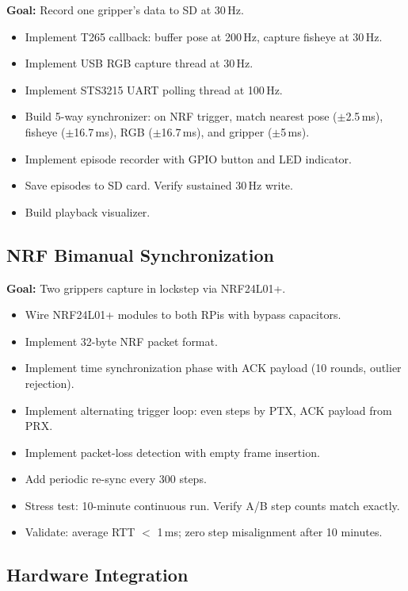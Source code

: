 \documentclass[11pt,a4paper]{article}
\begin{document}
\textbf{Goal:} Record one gripper's data to SD at 30\,Hz.

\begin{itemize}[label=$\square$]
  \item Implement T265 callback: buffer pose at 200\,Hz, capture fisheye at 30\,Hz.
  \item Implement USB RGB capture thread at 30\,Hz.
  \item Implement STS3215 UART polling thread at 100\,Hz.
  \item Build 5-way synchronizer: on NRF trigger, match nearest pose ($\pm$2.5\,ms), fisheye ($\pm$16.7\,ms), RGB ($\pm$16.7\,ms), and gripper ($\pm$5\,ms).
  \item Implement episode recorder with GPIO button and LED indicator.
  \item Save episodes to SD card. Verify sustained 30\,Hz write.
  \item Build playback visualizer.
\end{itemize}

\subsection{NRF Bimanual Synchronization}

\textbf{Goal:} Two grippers capture in lockstep via NRF24L01+.

\begin{itemize}[label=$\square$]
  \item Wire NRF24L01+ modules to both RPis with bypass capacitors.
  \item Implement 32-byte NRF packet format.
  \item Implement time synchronization phase with ACK payload (10 rounds, outlier rejection).
  \item Implement alternating trigger loop: even steps by PTX, ACK payload from PRX.
  \item Implement packet-loss detection with empty frame insertion.
  \item Add periodic re-sync every 300 steps.
  \item Stress test: 10-minute continuous run. Verify A/B step counts match exactly.
  \item Validate: average RTT $<$ 1\,ms; zero step misalignment after 10 minutes.
\end{itemize}

\subsection{Hardware Integration}
\end{document}
